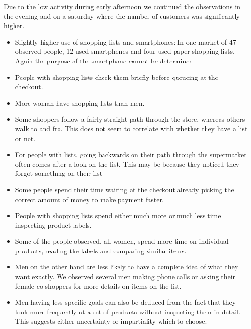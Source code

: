\documentclass{scrartcl}
\begin{document}
      Due to the low activity during early afternoon we continued the observations in the evening and on a saturday where the number of customers was significantly higher.
      \begin{itemize}
        \item Slightly higher use of shopping lists and smartphones: In one market of 47 observed people, 12 used smartphones and four used paper shopping lists. 
          Again the purpose of the smartphone cannot be determined.
        \item People with shopping lists check them briefly before queueing at the checkout.
        \item More woman have shopping lists than men.
        \item Some shoppers follow a fairly straight path through the store, whereas others walk to and fro. This does not seem to correlate with whether they have a list or not.
        \item For people with lists, going backwards on their path through the supermarket often comes after a look on the list. This may be because they noticed they forgot something on their list.
        \item Some people spend their time waiting at the checkout already picking the correct amount of money to make payment faster.
        \item People with shopping lists spend either much more or much less time inspecting product labels.
        \item Some of the people observed, all women, spend more time on individual products, reading the labels and comparing similar items.
        \item Men on the other hand are less likely to have a complete idea of what they want exactly. 
          We observed several men making phone calls or asking their female co-shoppers for more details on items on the list. 
        \item Men having less specific goals can also be deduced from the fact that they look more frequently at a set of products without inspecting them in detail. 
          This suggests either uncertainty or impartiality which to choose.

      \end{itemize}
\end{document}
